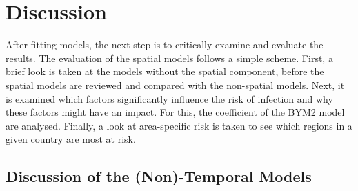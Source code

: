 %
\chapter{Discussion}\label{sec:discussion}
After fitting models, the next step is to critically examine and evaluate the results. The evaluation of the spatial models follows a simple scheme. First, a brief look is taken at the models without the spatial component, before the spatial models are reviewed and compared with the non-spatial models. Next, it is examined which factors significantly influence the risk of infection and why these factors might have an impact. For this, the coefficient of the BYM2 model are analysed. Finally, a look at area-specific risk is taken to see which regions in a given country are most at risk.
\section{Discussion of the (Non)-Temporal Models}
